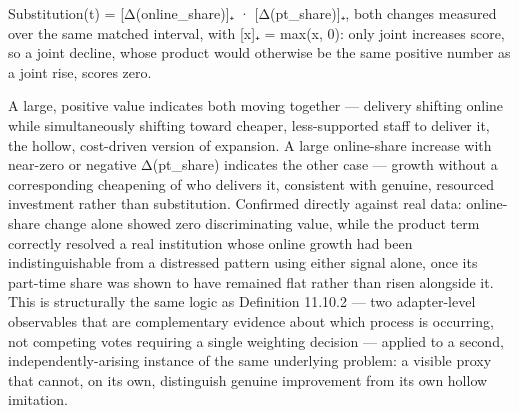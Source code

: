 \documentclass[
]{article}
\begin{document}
Substitution(t) = {[}Δ(online\_share){]}₊ · {[}Δ(pt\_share){]}₊, both
changes measured over the same matched interval, with {[}x{]}₊ = max(x,
0): only joint increases score, so a joint decline, whose product would
otherwise be the same positive number as a joint rise, scores zero.

A large, positive value indicates both moving together --- delivery
shifting online while simultaneously shifting toward cheaper,
less-supported staff to deliver it, the hollow, cost-driven version of
expansion. A large online-share increase with near-zero or negative
Δ(pt\_share) indicates the other case --- growth without a corresponding
cheapening of who delivers it, consistent with genuine, resourced
investment rather than substitution. Confirmed directly against real
data: online-share change alone showed zero discriminating value, while
the product term correctly resolved a real institution whose online
growth had been indistinguishable from a distressed pattern using either
signal alone, once its part-time share was shown to have remained flat
rather than risen alongside it. This is structurally the same logic as
Definition 11.10.2 --- two adapter-level observables that are
complementary evidence about which process is occurring, not competing
votes requiring a single weighting decision --- applied to a second,
independently-arising instance of the same underlying problem: a visible
proxy that cannot, on its own, distinguish genuine improvement from its
own hollow imitation.
\end{document}
